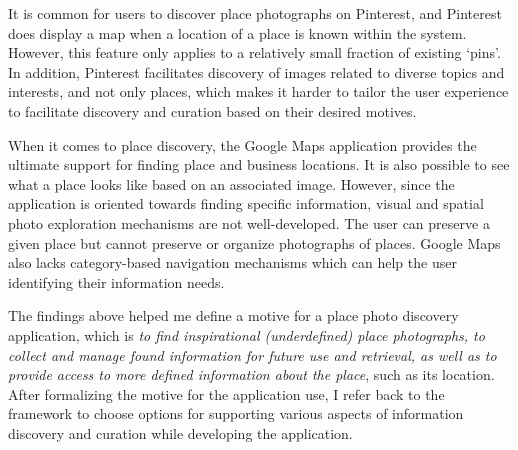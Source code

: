 {It is common for users to discover place photographs on Pinterest, and Pinterest does display a map when a location of a place is known within the system. However, this feature only applies to a relatively small fraction of existing `pins'. In addition, Pinterest facilitates discovery of images related to diverse topics and interests, and not only places, which makes it harder to tailor the user experience to facilitate discovery and curation based on their desired motives. 

When it comes to place discovery, the Google Maps application provides the ultimate support for finding place and business locations. It is also possible to see what a place looks like based on an associated image. However, since the application is oriented towards finding specific information, visual and spatial photo exploration mechanisms are not well-developed. The user can preserve a given place but cannot preserve or organize photographs of places. Google Maps also lacks category-based navigation mechanisms which can help the user identifying their information needs.  

The findings above helped me define a motive for a place photo discovery application, which is \textit{to find inspirational (underdefined) place photographs, to collect and manage found information for future use and retrieval, as well as to provide access to more defined information about the place}, such as its location. After formalizing the motive for the application use, I refer back to the framework to choose options for supporting various aspects of information discovery and curation while developing the application.
}

